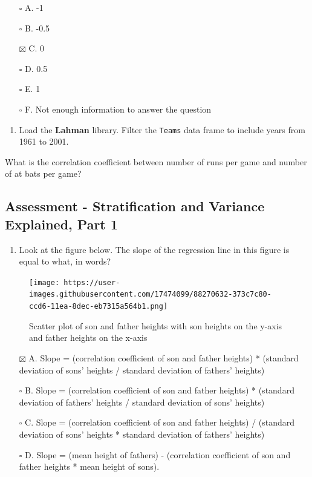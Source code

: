 \documentclass[
]{article}
\providecommand{\tightlist}{%
  \setlength{\itemsep}{0pt}\setlength{\parskip}{0pt}}
\begin{document}
\begin{itemize}
\tightlist
\item[$\square$]
  A. -1
\item[$\square$]
  B. -0.5
\item[$\boxtimes$]
  C. 0
\item[$\square$]
  D. 0.5
\item[$\square$]
  E. 1
\item[$\square$]
  F. Not enough information to answer the question
\end{itemize}

\begin{enumerate}
\def\labelenumi{\arabic{enumi}.}
\setcounter{enumi}{6}
\tightlist
\item
  Load the \textbf{Lahman} library. Filter the \texttt{Teams} data frame
  to include years from 1961 to 2001.
\end{enumerate}

What is the correlation coefficient between number of runs per game and
number of at bats per game?

\hypertarget{assessment---stratification-and-variance-explained-part-1}{%
\subsection{Assessment - Stratification and Variance Explained, Part
1}\label{assessment---stratification-and-variance-explained-part-1}}

\begin{enumerate}
\def\labelenumi{\arabic{enumi}.}
\tightlist
\item
  Look at the figure below. The slope of the regression line in this
  figure is equal to what, in words?
\end{enumerate}

\begin{figure}
\centering
\texttt{[image: https://user-images.githubusercontent.com/17474099/88270632-373c7c80-ccd6-11ea-8dec-eb7315a564b1.png]}
\caption{Scatter plot of son and father heights with son heights on the
y-axis and father heights on the x-axis}
\end{figure}

\begin{itemize}
\tightlist
\item[$\boxtimes$]
  A. Slope = (correlation coefficient of son and father heights) *
  (standard deviation of sons' heights / standard deviation of fathers'
  heights)
\item[$\square$]
  B. Slope = (correlation coefficient of son and father heights) *
  (standard deviation of fathers' heights / standard deviation of sons'
  heights)
\item[$\square$]
  C. Slope = (correlation coefficient of son and father heights) /
  (standard deviation of sons' heights * standard deviation of fathers'
  heights)
\item[$\square$]
  D. Slope = (mean height of fathers) - (correlation coefficient of son
  and father heights * mean height of sons).
\end{itemize}
\end{document}
